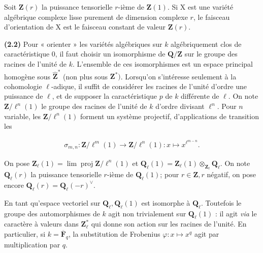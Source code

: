 \documentclass[10pt,leqno]{article}
\begin{document}
\noindent Soit \(\mathbf{Z}(r)\) la puissance tensorielle \(r\)-ième de \(\mathbf{Z}(1)\). Si \(\mathrm{X}\) est une variété algébrique complexe lisse purement de dimension complexe \(r\), le faisceau d’orientation de \(\mathrm{X}\) est le faisceau constant de valeur \(\mathbf{Z}(r)\).\par

\noindent \textbf{(2.2)} Pour « orienter » les variétés algébriques sur \(k\) algébriquement clos de caractéristique 0, il faut choisir un isomorphisme de \(\mathbf{Q}/\mathbf{Z}\) sur le groupe des racines de l’unité de \(k\). L’ensemble de ces isomorphismes est un espace principal homogène sous \(\widehat{\mathbf{Z}}^{*}\) (non plus sous \(\mathbf{Z}^{*})\). Lorsqu’on s’intéresse seulement à la cohomologie \(\ell \)-adique, il suffit de considérer les racines de l’unité d’ordre une puissance de \(\ell \), et de supposer la caractéristique \(p\) de \(k\) différente de \(\ell \). On note \(\mathbf{Z}/\ell ^{n}(1)\) le groupe des racines de l’unité de \(k\) d’ordre divisant \(\ell ^{n}\). Pour \(n\) variable, les \(\mathbf{Z}/\ell ^{n}(1)\) forment un système projectif, d’applications de transition les\par

\begin{equation*}\begin{gathered}\sigma _{m,n} : \mathbf{Z}/\ell ^{m}(1) \longrightarrow  \mathbf{Z}/\ell ^{n}(1) : x\longmapsto x^{\ell ^{m- n}}.\end{gathered}\end{equation*}

\noindent On pose \(\mathbf{Z}_{\ell }(1)=\operatorname{lim} \operatorname{proj} \mathbf{Z}/\ell ^{n}(1)\) et \(\mathbf{Q}_{\ell }(1)=\mathbf{Z}_{\ell }(1)\otimes _{\mathbf{Z}_{\ell }}\mathbf{Q}_{\ell }\). On note \(\mathbf{Q}_{\ell }(r)\) la puissance tensorielle \(r\)-ième de \(\mathbf{Q}_{\ell }(1)\); pour \(r\in \mathbf{Z}, r\) négatif, on pose encore \(\mathbf{Q}_{\ell }(r)=\mathbf{Q}_{\ell }(- r)^{\vee }\).\par

\clearpage

\label{physical-10}\par\smallskip

\noindent En tant qu’espace vectoriel sur \(\mathbf{Q}_{\ell }, \mathbf{Q}_{\ell }(1)\) est isomorphe à \(\mathbf{Q}_{\ell }\). Toutefois le groupe des automorphismes de \(k\) agit non trivialement sur \(\mathbf{Q}_{\ell }(1)\) : il agit \emph{via} le caractère à valeurs dans \(\mathbf{Z}_{\ell }^{*}\) qui donne son action sur les racines de l’unité. En particulier, si \(k=\overline{\mathbf{F}}_{q}\), la substitution de Frobenius \(\varphi  : x\longmapsto x^{q}\) agit par multiplication par \(q\).\par
\end{document}

